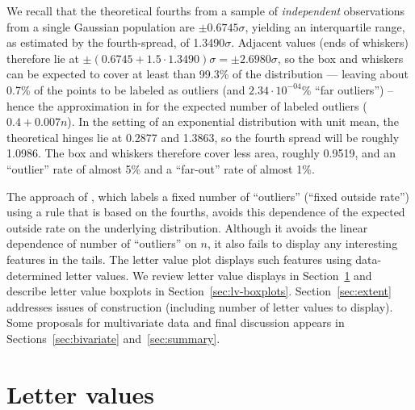 \documentclass[oneside]{article}
\begin{document}
We recall that the theoretical fourths from a sample of \textit{independent} observations from a single Gaussian population are $\pm 0.6745\sigma$, yielding an interquartile range, as estimated by the fourth-spread, of 1.3490$\sigma$. Adjacent values (ends of whiskers) therefore lie at $\pm (0.6745 + 1.5 \cdot 1.3490)\sigma = \pm 2.6980\sigma$, so the box and whiskers can be expected to cover at least than 99.3\% of the distribution --- leaving about 0.7\% of the points to be labeled as outliers (and $2.34 \cdot 10^{-04}$\% ``far outliers'') -- hence the approximation in \citet[pg. 34]{dchlv} for the expected number of labeled outliers ($0.4 + 0.007n$). In the setting of an exponential distribution with unit mean, the theoretical hinges lie at 0.2877 and 1.3863, so the fourth spread will be roughly 1.0986. The box and whiskers therefore cover less area, roughly 0.9519, and an ``outlier'' rate of almost 5\% and a ``far-out'' rate of almost 1\%.

The approach of \citet{dchbi}, which labels a fixed number of ``outliers'' (``fixed outside rate'') using a rule that is based on the fourths, avoids this dependence of the expected outside rate on the underlying distribution. Although it avoids the linear dependence of number of ``outliers'' on $n$, it also fails to display any interesting features in the tails. The letter value plot displays such features using data-determined letter values. We review letter value displays in Section~\ref{sec:letter-values} and describe letter value boxplots in Section~\ref{sec:lv-boxplots}. Section~\ref{sec:extent} addresses issues of construction (including number of letter values to display). Some proposals for multivariate data and final discussion appears in Sections~\ref{sec:bivariate} and~\ref{sec:summary}.

\section{Letter values}
\label{sec:letter-values}
\end{document}
